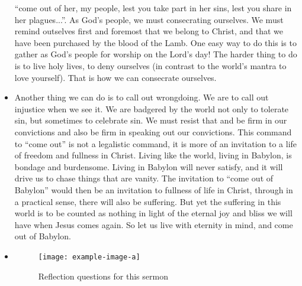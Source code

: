 \begin{itemize}
{  ``come out of her, my people, lest you take part in her sins, lest you
  share in her plagues...''.  As God's people, we must consecrating
  ourselves.  We must remind outselves first and foremost that we belong to
  Christ, and that we have been purchased by the blood of the Lamb.  One easy
  way to do this is to gather as God's people for worship on the Lord's day!
  The harder thing to do is to live holy lives, to deny ourselves (in
  contrast to the world's mantra to love yourself).  That is how we can
  consecrate ourselves.}
  \item{Another thing we can do is to call out wrongdoing.  We are to call
  out injustice when we see it.  We are badgered by the world not only to
  tolerate sin, but sometimes to celebrate sin.  We must resist that and be
  firm in our convictions and also be firm in speaking out our convictions.
  This command to ``come out'' is not a legalistic command, it is more of an
  invitation to a life of freedom and fullness in Christ.  Living like the
  world, living in Babylon, is bondage and burdensome.  Living in Babylon
  will never satisfy, and it will drive us to chase things that are vanity.
  The invitation to ``come out of Babylon'' would then be an invitation to
  fullness of life in Christ, through in a practical sense, there will also
  be suffering.  But yet the suffering in this world is to be counted as
  nothing in light of the eternal joy and bliss we will have when Jesus comes
  again.  So let us live with eternity in mind, and come out of Babylon.  }
  \item{\begin{figure}[H]
    \centering
    \texttt{[image: example-image-a]}
    \caption[]{Reflection questions for this sermon}
    \label{}
  \end{figure}}
\end{itemize}
